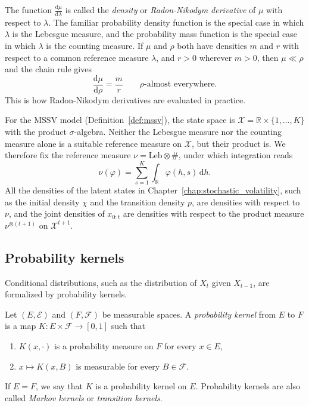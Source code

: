 The function $\frac{\mathrm{d}\mu}{\mathrm{d}\lambda}$ is called the \emph{density} or \emph{Radon-Nikodym derivative} of $\mu$ with respect to $\lambda$. The familiar probability density function is the special case in which $\lambda$ is the Lebesgue measure, and the probability mass function is the special case in which $\lambda$ is the counting measure. If $\mu$ and $\rho$ both have densities $m$ and $r$ with respect to a common reference measure $\lambda$, and $r>0$ wherever $m>0$, then $\mu\ll\rho$ and the chain rule gives
\begin{equation}
    \frac{\mathrm{d}\mu}{\mathrm{d}\rho} = \frac{m}{r} \qquad \rho\text{-almost everywhere}.
    \label{eq:density_ratio}
\end{equation}
This is how Radon-Nikodym derivatives are evaluated in practice.

For the MSSV model (Definition~\ref{def:mssv}), the state space is $\mathcal{X} = \mathbb{R}\times\{1,\ldots,K\}$ with the product $\sigma$-algebra. Neither the Lebesgue measure nor the counting measure alone is a suitable reference measure on $\mathcal{X}$, but their product is. We therefore fix the reference measure $\nu = \mathrm{Leb}\otimes\#$, under which integration reads
\begin{equation}
    \nu(\varphi) = \sum_{s=1}^{K}\int_{\mathbb{R}}\varphi(h,s)\,\mathrm{d}h.
\end{equation}
All the densities of the latent states in Chapter~\ref{chap:stochastic_volatility}, such as the initial density $\chi$ and the transition density $p$, are densities with respect to $\nu$, and the joint densities of $x_{0:t}$ are densities with respect to the product measure $\nu^{\otimes(t+1)}$ on $\mathcal{X}^{t+1}$.

\subsection{Probability kernels}
\label{sec:probability_kernels}
Conditional distributions, such as the distribution of $X_t$ given $X_{t-1}$, are formalized by probability kernels.

\begin{definition}
    \label{def:probability_kernel}
    Let $(E,\mathcal{E})$ and $(F,\mathcal{F})$ be measurable spaces. A \emph{probability kernel} from $E$ to $F$ is a map $K\colon E\times\mathcal{F}\to[0,1]$ such that
    \begin{enumerate}
        \item $K(x,\cdot)$ is a probability measure on $F$ for every $x\in E$,
        \item $x\mapsto K(x,B)$ is measurable for every $B\in\mathcal{F}$.
    \end{enumerate}
    If $E=F$, we say that $K$ is a probability kernel on $E$. Probability kernels are also called \emph{Markov kernels} or \emph{transition kernels}.
\end{definition}

